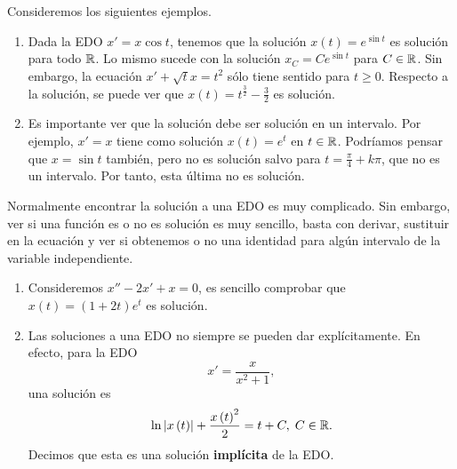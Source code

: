 \begin{eg}
Consideremos los siguientes ejemplos.
\begin{enumerate}
\item Dada la EDO $\displaystyle x' = x\cos t $, tenemos que la solución $\displaystyle x\left(t\right) = e^{\sin t} $ es solución para todo $\displaystyle \mathbb{R} $. Lo mismo sucede con la solución $\displaystyle x_{C} = Ce^{\sin t} $ para $\displaystyle C \in \mathbb{R} $. Sin embargo, la ecuación $\displaystyle x' + \sqrt{t} x = t ^{2} $ sólo tiene sentido para $\displaystyle t \geq 0 $. Respecto a la solución, se puede ver que $\displaystyle x\left(t\right) = t ^{\frac{3}{2}} - \frac{3}{2} $ es solución.
\item Es importante ver que la solución debe ser solución en un intervalo. Por ejemplo, $\displaystyle x' = x $ tiene como solución $\displaystyle x\left(t\right) = e^{t } $ en $\displaystyle t \in \mathbb{R} $. Podríamos pensar que $\displaystyle x = \sin t $ también, pero no es solución salvo para $\displaystyle t = \frac{\pi }{4} + k \pi  $, que no es un intervalo. Por tanto, esta última no es solución.
\end{enumerate}
\end{eg}
Normalmente encontrar la solución a una EDO es muy complicado. Sin embargo, ver si una función es o no es solución es muy sencillo, basta con derivar, sustituir en la ecuación y ver si obtenemos o no una identidad para algún intervalo de la variable independiente.
\begin{eg}
\begin{enumerate}
\item Consideremos $\displaystyle x'' - 2x' + x = 0 $, es sencillo comprobar que $\displaystyle x\left(t\right)=\left(1+2t\right)e^{t} $ es solución. 
\item Las soluciones a una EDO no siempre se pueden dar explícitamente. En efecto, para la EDO
	\[x' = \frac{x}{x^{2}+1} ,\]
	una solución es
	\[\ln \left|x\left(t\right)\right| + \frac{x\left(t\right)^{2}}{2} = t + C, \; C \in \mathbb{R} .\]
Decimos que esta es una solución \textbf{implícita} de la EDO. 	
\end{enumerate}

\end{eg}

